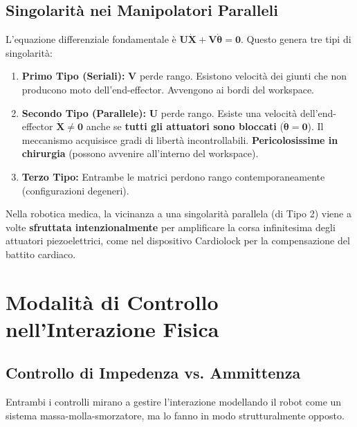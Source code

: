 \documentclass[11pt,a4paper,twoside]{report}
\begin{document}
\section{Singolarità nei Manipolatori Paralleli}
L'equazione differenziale fondamentale è $\mathbf{U}\dot{\mathbf{X}} + \mathbf{V}\dot{\boldsymbol{\theta}} = \mathbf{0}$. Questo genera tre tipi di singolarità:
\begin{enumerate}
    \item \textbf{Primo Tipo (Seriali):} $\mathbf{V}$ perde rango. Esistono velocità dei giunti che non producono moto dell'end-effector. Avvengono ai bordi del workspace.
    \item \textbf{Secondo Tipo (Parallele):} $\mathbf{U}$ perde rango. Esiste una velocità dell'end-effector $\dot{\mathbf{X}} \neq \mathbf{0}$ anche se \textbf{tutti gli attuatori sono bloccati} ($\dot{\boldsymbol{\theta}} = \mathbf{0}$). Il meccanismo acquisisce gradi di libertà incontrollabili. \textbf{Pericolosissime in chirurgia} (possono avvenire all'interno del workspace).
    \item \textbf{Terzo Tipo:} Entrambe le matrici perdono rango contemporaneamente (configurazioni degeneri).
\end{enumerate}

\begin{conceptbox}
    Nella robotica medica, la vicinanza a una singolarità parallela (di Tipo 2) viene a volte \textbf{sfruttata intenzionalmente} per amplificare la corsa infinitesima degli attuatori piezoelettrici, come nel dispositivo Cardiolock per la compensazione del battito cardiaco.
\end{conceptbox}


\chapter{Modalità di Controllo nell'Interazione Fisica}

\section{Controllo di Impedenza vs. Ammittenza}
Entrambi i controlli mirano a gestire l'interazione modellando il robot come un sistema massa-molla-smorzatore, ma lo fanno in modo strutturalmente opposto.
\end{document}
